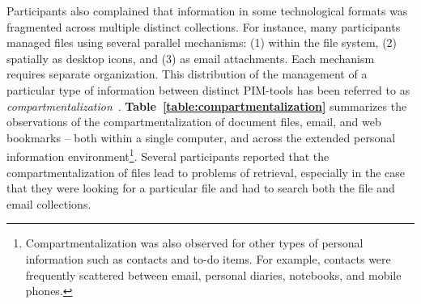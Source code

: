 Participants also complained that information in some technological formats was fragmented across multiple distinct collections.  For instance, many participants managed files using several parallel mechanisms: (1) within the file system, (2) spatially as desktop icons, and (3) as email attachments. Each mechanism requires separate organization.  This distribution of the management of a particular type of information between distinct PIM-tools has been referred to as \textit{compartmentalization}~\citep{Bellotti:00}.  \textbf{Table~\ref{table:compartmentalization}} summarizes the observations of the compartmentalization of document files, email, and web bookmarks -- both within a single computer, and across the extended personal information environment\footnote{Compartmentalization was also observed for other types of personal information such as contacts and to-do items.  For example, contacts were frequently scattered between email, personal diaries, notebooks, and mobile phones.}.
Several participants reported that the compartmentalization of files lead to problems of retrieval, especially in the case that they were looking for a particular file and had to search both the file and email collections.%

